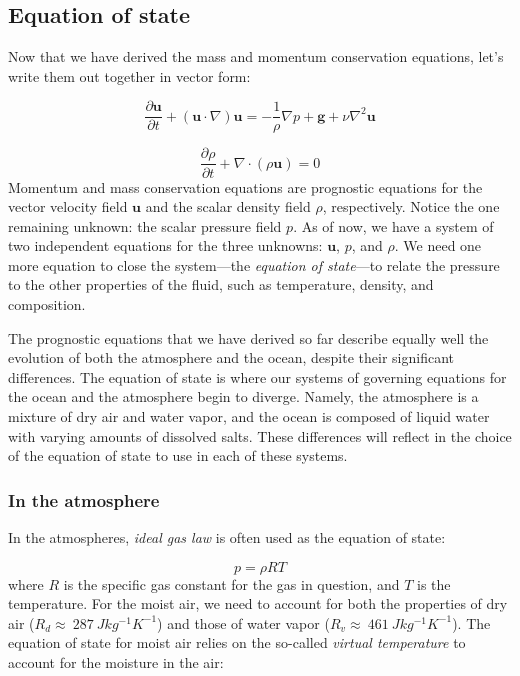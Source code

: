 \documentclass[12pt]{article}
\numberwithin{equation}{section}
\numberwithin{figure}{section}
\numberwithin{table}{section}
\begin{document}
\subsection{Equation of state}

Now that we have derived the mass and momentum conservation equations, let's
write them out together in vector form:

\begin{equation}
  \frac{\partial \mathbf{u}}{\partial t} + (\mathbf{u} \cdot \nabla) \mathbf{u} =
  - \frac{1}{\rho} \nabla p + \mathbf{g} + \nu \nabla^2 \mathbf{u}
  \label{eq:momentum_navier_stokes_state}
\end{equation}

\begin{equation}
  \frac{\partial \rho}{\partial t} + \nabla \cdot (\rho \mathbf{u}) = 0
  \label{eq:continuity_eulerian_state}
\end{equation}
Momentum and mass conservation equations are prognostic equations for the
vector velocity field $\mathbf{u}$ and the scalar density field $\rho$,
respectively.
Notice the one remaining unknown: the scalar pressure field $p$.
As of now, we have a system of two independent equations for the three unknowns:
$\mathbf{u}$, $p$, and $\rho$.
We need one more equation to close the system---the
\textit{equation of state}---to relate the pressure to
the other properties of the fluid, such as temperature, density, and
composition.

The prognostic equations that we have derived so far describe equally well
the evolution of both the atmosphere and the ocean, despite their significant
differences.
The equation of state is where our systems of governing equations for the ocean
and the atmosphere begin to diverge.
Namely, the atmosphere is a mixture of dry air and water vapor, and the
ocean is composed of liquid water with varying amounts of dissolved salts.
These differences will reflect in the choice of the equation of state to use
in each of these systems.

\subsubsection{In the atmosphere}

In the atmospheres, \textit{ideal gas law}
is often used as the equation of state:

\begin{equation}
  p = \rho R T
  \label{eq:ideal_gas_law}
\end{equation}
where $R$ is the specific gas constant for the gas in question, and $T$ is the
temperature.
For the moist air, we need to account for both the properties of dry air
($R_d \approx\ 287\ J kg^{-1} K^{-1}$) and those of water vapor
($R_v \approx\ 461\ J kg^{-1} K^{-1}$).
The equation of state for moist air relies on the so-called
\textit{virtual temperature} to account for the
moisture in the air:
\end{document}
